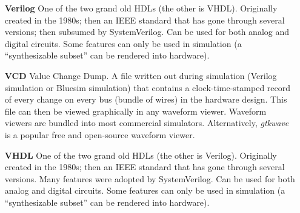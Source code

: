 \begin{itemize}
\item[\bf Verilog] One of the two grand old HDLs (the other is VHDL).
  Originally created in the 1980s; then an IEEE standard that has gone
  through several versions; then subsumed by SystemVerilog.  Can be
  used for both analog and digital circuits.  Some features can only
  be used in simulation (a ``synthesizable subset'' can be rendered
  into hardware).

\item[\bf VCD] Value Change Dump.  A file written out during
  simulation (Verilog simulation or Bluesim simulation) that contains
  a clock-time-stamped record of every change on every bus (bundle of
  wires) in the hardware design.  This file can then be viewed
  graphically in any waveform viewer.  Waveform viewers are bundled
  into most commercial simulators. Alternatively, \emph{gtkwave} is a
  popular free and open-source waveform viewer.

\item[\bf VHDL] One of the two grand old HDLs (the other is Verilog).
  Originally created in the 1980s; then an IEEE standard that has gone
  through several versions. Many features were adopted by
  SystemVerilog.  Can be used for both analog and digital circuits.
  Some features can only be used in simulation (a ``synthesizable
  subset'' can be rendered into hardware).

\end{itemize}

